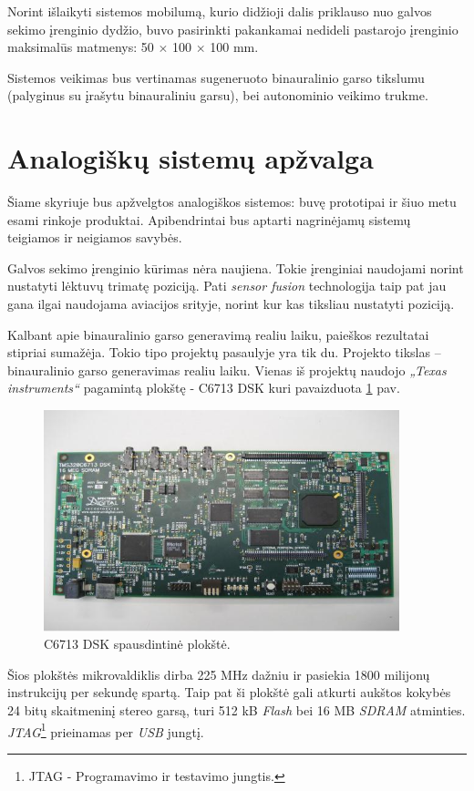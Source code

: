 \documentclass[]{vgtuef}
\begin{document}
Norint išlaikyti sistemos mobilumą, kurio didžioji dalis priklauso nuo galvos sekimo įrenginio dydžio, buvo pasirinkti pakankamai nedideli pastarojo įrenginio maksimalūs matmenys: 50 $\times$ 100 $\times$ 100 mm.

Sistemos veikimas bus vertinamas sugeneruoto binauralinio garso tikslumu (palyginus su įrašytu binauraliniu garsu), bei autonominio veikimo trukme.


\section{Analogiškų sistemų apžvalga}

Šiame skyriuje bus apžvelgtos analogiškos sistemos: buvę prototipai ir šiuo metu esami rinkoje produktai. Apibendrintai bus aptarti nagrinėjamų sistemų teigiamos ir neigiamos savybės. 


Galvos sekimo įrenginio kūrimas nėra naujiena. Tokie įrenginiai naudojami norint nustatyti lėktuvų  trimatę poziciją. Pati \textit{sensor fusion} technologija taip pat jau gana ilgai naudojama aviacijos srityje, norint kur kas tiksliau nustatyti poziciją.

Kalbant apie binauralinio garso generavimą realiu laiku, paieškos rezultatai stipriai sumažėja. Tokio tipo projektų pasaulyje yra tik du. Projekto tikslas – binauralinio garso generavimas realiu laiku. Vienas iš projektų naudojo \textit{„Texas instruments“} pagamintą plokštę - C6713 DSK kuri pavaizduota \ref{fig:C6713_dsk_board} pav.

\begin{figure}[!ht]
  \centering
  \includegraphics[width=390px]{img/c6713.jpg}
  \caption{C6713 DSK spausdintinė plokštė.}
  \label{fig:C6713_dsk_board}
\end{figure}

Šios plokštės mikrovaldiklis dirba 225 MHz dažniu ir pasiekia 1800 milijonų instrukcijų per sekundę spartą. Taip pat ši plokštė gali atkurti aukštos kokybės 24 bitų skaitmeninį stereo garsą, turi 512 kB \textit{Flash} bei 16 MB \textit{SDRAM} atminties. \textit{JTAG}\footnote{JTAG - Programavimo ir testavimo jungtis.} prieinamas per \textit{USB} jungtį.
\end{document}
